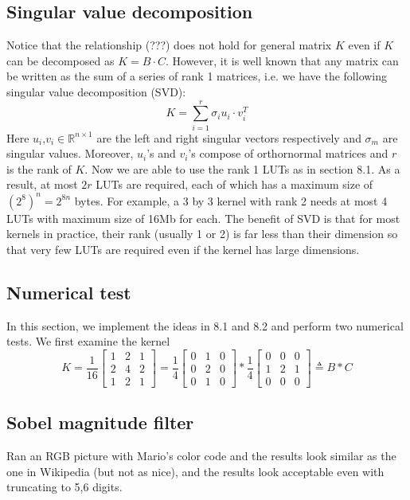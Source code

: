 \documentclass[12pt]{amsart}
\theoremstyle{definition}
\theoremstyle{remark}
\numberwithin{thm}{section}
\begin{document}
\subsection{Singular value decomposition}
Notice that the relationship (???) does not hold for general matrix $K$ even if $K$ can be decomposed as $K=B\cdot C$. However, it is well known that any matrix can be written as the sum of a series of rank 1 matrices, i.e. we have the following singular value decomposition (SVD): 
\[K=\sum_{i=1}^{r}\sigma_i u_i\cdot v_i^T\]
Here $u_i$,$v_i\in\mathbb{R}^{n\times 1}$ are the left and right singular vectors respectively and $\sigma_m$ are singular values. Moreover, $u_i$'s and $v_i$'s compose of orthornormal matrices and $r$ is the rank of $K$. Now we are able to use the rank 1 LUTs as in section 8.1. As a result, at most $2r$ LUTs are required, each of which has a maximum size of $(2^8)^n=2^{8n}$ bytes. For example, a 3 by 3 kernel with rank 2 needs at most 4 LUTs with maximum size of 16Mb for each. The benefit of SVD is that for most kernels in practice, their rank (usually 1 or 2) is far less than their dimension so that very few LUTs are required even if the kernel has large dimensions. 
\subsection{Numerical test}
In this section, we implement the ideas in 8.1 and 8.2 and perform two numerical tests. We first examine the kernel
$$
K=\frac{1}{16}
\begin{bmatrix}
1 & 2 & 1\\
2 & 4 & 2\\
1 & 2 & 1
\end{bmatrix}
=
\frac{1}{4}
\begin{bmatrix}
0 & 1 & 0\\
0 & 2 & 0\\
0 & 1 & 0
\end{bmatrix}*\frac{1}{4}
\begin{bmatrix}
0 & 0 & 0\\
1 & 2 & 1\\
0 & 0 & 0
\end{bmatrix}\triangleq B*C
$$

\subsection{Sobel magnitude filter}
Ran an RGB picture with Mario's color code and the results look similar as the one in Wikipedia (but not as nice), and the results look acceptable even with truncating to 5,6 digits.
\end{document}
